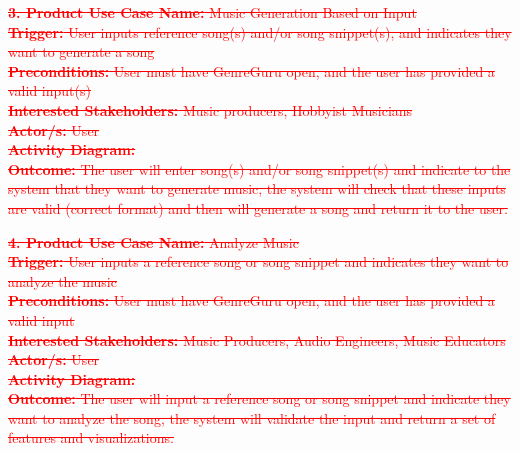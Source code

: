 \documentclass[12pt]{article}
\begin{document}
\textcolor{red}{\sout{\noindent \textbf{3. Product Use Case Name:} Music Generation Based on Input}} \\
\textcolor{red}{\sout{\textbf{Trigger:} User inputs reference song(s) and/or song snippet(s), and indicates they want to generate a song}} \\
\textcolor{red}{\sout{\textbf{Preconditions:} User must have GenreGuru open, and the user has provided a valid input(s)}} \\
\textcolor{red}{\sout{\textbf{Interested Stakeholders:} Music producers, Hobbyist Musicians}} \\
\textcolor{red}{\sout{\textbf{Actor/s:} User}} \\
\textcolor{red}{\sout{\textbf{Activity Diagram:}}} \\
\textcolor{red}{\sout{\textbf{Outcome:} The user will enter song(s) and/or song snippet(s) and indicate to the system that they want to generate music, the system will check that these inputs are valid (correct format) and then will generate a song and return it to the user.}}

\vspace{1cm}

\textcolor{red}{\sout{\noindent \textbf{4. Product Use Case Name:} Analyze Music}} \\
\textcolor{red}{\sout{\textbf{Trigger:} User inputs a reference song or song snippet and indicates they want to analyze the music}} \\
\textcolor{red}{\sout{\textbf{Preconditions:} User must have GenreGuru open, and the user has provided a valid input}} \\
\textcolor{red}{\sout{\textbf{Interested Stakeholders:} Music Producers, Audio Engineers, Music Educators}} \\
\textcolor{red}{\sout{\textbf{Actor/s:} User}} \\
\textcolor{red}{\sout{\textbf{Activity Diagram:}}} \\
\textcolor{red}{\sout{\textbf{Outcome:} The user will input a reference song or song snippet and indicate they want to analyze the song, the system will validate the input and return a set of features and visualizations.}}

\vspace{1cm}
\end{document}
